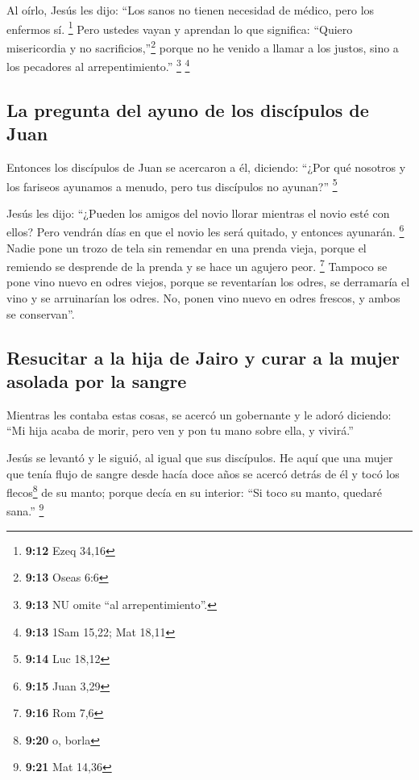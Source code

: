  Al oírlo, Jesús les dijo: ``Los sanos no tienen
necesidad de médico, pero los enfermos sí. \footnote{\textbf{9:12} Ezeq
  34,16}  Pero ustedes vayan y aprendan lo que significa:
``Quiero misericordia y no sacrificios,''\footnote{\textbf{9:13} Oseas
  6:6} porque no he venido a llamar a los justos, sino a los pecadores
al arrepentimiento.'' \footnote{\textbf{9:13} NU omite ``al
  arrepentimiento''.} \footnote{\textbf{9:13} 1Sam 15,22; Mat 18,11}

\hypertarget{la-pregunta-del-ayuno-de-los-discuxedpulos-de-juan}{%
\subsection{La pregunta del ayuno de los discípulos de
Juan}\label{la-pregunta-del-ayuno-de-los-discuxedpulos-de-juan}}

 Entonces los discípulos de Juan se acercaron a él,
diciendo: ``¿Por qué nosotros y los fariseos ayunamos a menudo, pero tus
discípulos no ayunan?'' \footnote{\textbf{9:14} Luc 18,12}

 Jesús les dijo: ``¿Pueden los amigos del novio llorar
mientras el novio esté con ellos? Pero vendrán días en que el novio les
será quitado, y entonces ayunarán. \footnote{\textbf{9:15} Juan 3,29}
 Nadie pone un trozo de tela sin remendar en una prenda
vieja, porque el remiendo se desprende de la prenda y se hace un agujero
peor. \footnote{\textbf{9:16} Rom 7,6}  Tampoco se pone
vino nuevo en odres viejos, porque se reventarían los odres, se
derramaría el vino y se arruinarían los odres. No, ponen vino nuevo en
odres frescos, y ambos se conservan''.

\hypertarget{resucitar-a-la-hija-de-jairo-y-curar-a-la-mujer-asolada-por-la-sangre}{%
\subsection{Resucitar a la hija de Jairo y curar a la mujer asolada por
la
sangre}\label{resucitar-a-la-hija-de-jairo-y-curar-a-la-mujer-asolada-por-la-sangre}}

 Mientras les contaba estas cosas, se acercó un
gobernante y le adoró diciendo: ``Mi hija acaba de morir, pero ven y pon
tu mano sobre ella, y vivirá.''

 Jesús se levantó y le siguió, al igual que sus
discípulos.  He aquí que una mujer que tenía flujo de
sangre desde hacía doce años se acercó detrás de él y tocó los
flecos\footnote{\textbf{9:20} o, borla} de su manto; 
porque decía en su interior: ``Si toco su manto, quedaré sana.''
\footnote{\textbf{9:21} Mat 14,36}

